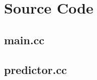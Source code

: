 \documentclass[]{report}   %
\begin{document}
\chapter{Source Code}
\section{main.cc}

\pagebreak

\section{predictor.cc}

\pagebreak



\end{document}
